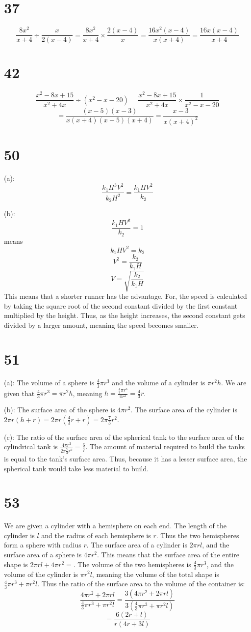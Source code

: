 \documentclass{article}
\theoremstyle{definition}
\newcommand{\?}{\stackrel{?}{=}}
\begin{document}
\section*{37}
\[ \frac{8x^2}{x+4}\div\frac{x}{2(x-4)}=\frac{8x^2}{x+4}\times\frac{2(x-4)}{x}=\frac{16x^2(x-4)}{x(x+4)}=\frac{16x(x-4)}{x+4} \]

\section*{42}
\[ \frac{x^2-8x+15}{x^2+4x}\div(x^2-x-20)=\frac{x^2-8x+15}{x^2+4x}\times\frac{1}{x^2-x-20} \]
\[ =\frac{(x-5)(x-3)}{x(x+4)(x-5)(x+4)}=\frac{x-3}{x(x+4)^2} \]

\section*{50}
(a): \[ \frac{k_1H^3V^2}{k_2H^2}=\frac{k_1HV^2}{k_2} \]


(b): \[ \frac{k_1HV^2}{k_2}=1 \] means \[ k_1HV^2=k_2 \] \[ V^2=\frac{k_2}{k_1H} \] \[ V=\sqrt{\frac{k_2}{k_1H}} \]
This means that a shorter runner has the advantage. For, the speed is calculated by taking the square root of the second constant divided by the first constant multiplied by the height. Thus, as 
the height increases, the second constant gets divided by a larger amount, meaning the speed becomes smaller.

\section*{51}
(a): The volume of a sphere is $\frac{4}{3}\pi r^3$ and the volume of a cylinder is $\pi r^2h$. We are given that $\frac{4}{3}\pi r^3=\pi r^2h$, 
meaning $h=\frac{\frac{4}{3}\pi r^3}{\pi r^2}=\frac{4}{3}r$.


(b): The surface area of the sphere is $4\pi r^2$. The surface area of the cylinder is $2\pi r(h+r)=2\pi r(\frac{4}{3}r+r)=2\pi\frac{7}{3}r^2$.


(c): The ratio of the surface area of the spherical tank to the surface area of the cylindrical tank is 
$\frac{4\pi r^2}{2\pi\frac{7}{3}r^2}=\frac{6}{7}$. The amount of material required to build the tanks is equal to the tank's surface area. Thus, because it has a lesser surface area, 
the spherical tank would take less material to build.

\section*{53}
We are given a cylinder with a hemisphere on each end. The length of the cylinder is $l$ and the radius of each hemisphere is $r$. Thus the two hemispheres form a sphere with radius $r$. 
The surface area of a cylinder is $2\pi rl$, and the surface area of a sphere is $4\pi r^2$. This means that the surface area of the entire shape is 
$2\pi rl+4\pi r^2=$. The volume of the two  hemispheres is $\frac{4}{3}\pi r^3$, and the volume of the cylinder is $\pi r^2l$, meaning the 
volume of the total shape is $\frac{4}{3}\pi r^3+\pi r^2l$. Thus the ratio of the surface area to the volume of the container is:
\[ \frac{4\pi r^2+2\pi rl}{\frac{4}{3}\pi r^3+\pi r^2l}=\frac{3(4\pi r^2+2\pi rl)}{3(\frac{4}{3}\pi r^3+\pi r^2l)} \]
\[ =\frac{6(2r+l)}{r(4r+3l)} \]
\end{document}
